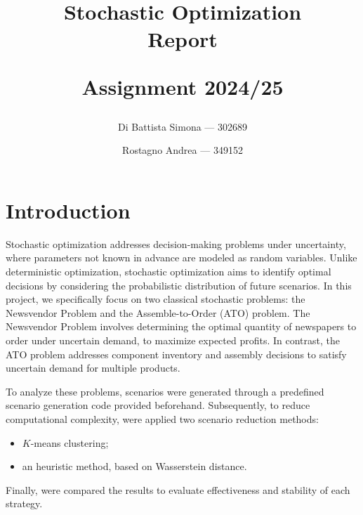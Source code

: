 \documentclass[a4paper,12pt]{article}
\begin{document}
	
\title{\textbf{Stochastic Optimization}\\
	\vspace{0.5em}\huge\textbf{Report}
	\author{
		Di Battista Simona — 302689%
		\and
		Rostagno Andrea — 349152\\
	}
	
	\vspace{0.5cm}
	\large Assignment 2024/25}
\maketitle
\thispagestyle{empty}   %
\newpage                %

	
	\tableofcontents
	\newpage                %
	
	
	\section{Introduction}
	Stochastic optimization addresses decision-making problems under uncertainty, where parameters not known in advance are modeled as random variables. Unlike deterministic optimization, stochastic optimization aims to identify optimal decisions by considering the probabilistic distribution of future scenarios. In this project, we specifically focus on two classical stochastic problems: the Newsvendor Problem and the Assemble-to-Order (ATO) problem. The Newsvendor Problem involves determining the optimal quantity of newspapers to order under uncertain demand, to maximize expected profits. In contrast, the ATO problem addresses component inventory and assembly decisions to satisfy uncertain demand for multiple products.
	
	To analyze these problems, scenarios were generated through a predefined scenario generation code provided beforehand. Subsequently, to reduce computational complexity, were applied two scenario reduction methods: 
	\begin{itemize}
	\item $K$-means clustering; 
	\item an heuristic method, based on Wasserstein distance.
	\end{itemize}
	 Finally, were compared the results to evaluate effectiveness and stability of each strategy.
	
\end{document}
